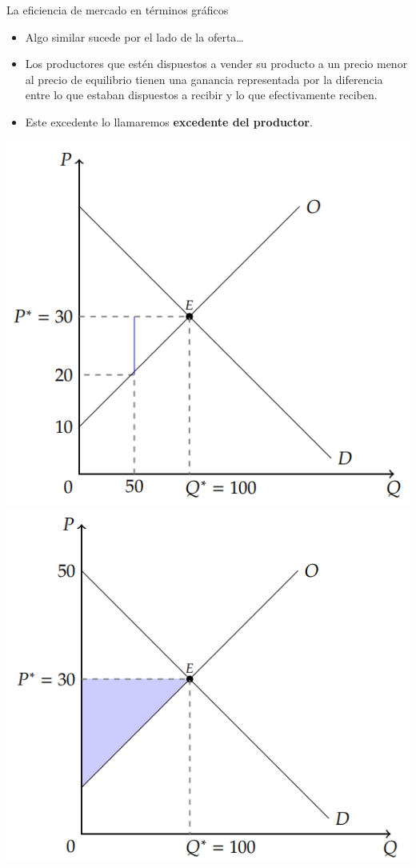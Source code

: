 \documentclass{beamer}
\begin{document}
\begin{frame}{La eficiencia de mercado en términos gráficos}
  \begin{itemize}
    \item Algo similar sucede por el lado de la oferta\dots
    \item Los productores que estén dispuestos a vender su producto a un precio menor al precio de equilibrio tienen una ganancia representada por la diferencia entre lo que estaban dispuestos a recibir y lo que efectivamente reciben.
    \item Este excedente lo llamaremos \textbf{excedente del productor}.
  \end{itemize}
  \centering
  \includegraphics[scale=0.4]{../Figures/C17.7.png}
  \includegraphics[scale=0.4]{../Figures/C17.8.png}
\end{frame}
\end{document}
